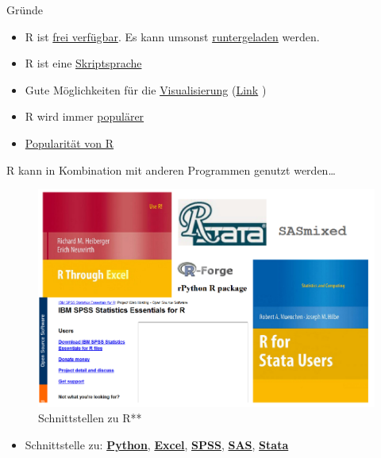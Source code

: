 \documentclass[
  ignorenonframetext,
]{beamer}
\providecommand{\tightlist}{%
  \setlength{\itemsep}{0pt}\setlength{\parskip}{0pt}}
\begin{document}
\begin{frame}{Gründe}
\protect\hypertarget{grunde}{}

\begin{itemize}
\tightlist
\item
  R ist \href{http://www.inside-r.org/why-use-r}{frei verfügbar}. Es
  kann umsonst \href{http://mirrors.softliste.de/cran/}{runtergeladen}
  werden.
\item
  R ist eine
  \href{https://de.wikipedia.org/wiki/Skriptsprache}{Skriptsprache}
\item
  Gute Möglichkeiten für die
  \href{http://research.stowers-institute.org/efg/R/}{Visualisierung}
  (\href{http://www.sr.bham.ac.uk/~ajrs/R/r-gallery.html}{Link} )
\item
  R wird immer
  \href{https://twitter.com/josiahjdavis/status/559778930476220418}{populärer}
\item
  \href{http://blog.revolutionanalytics.com/popularity/}{Popularität von
  R}
\end{itemize}

\end{frame}

\begin{frame}{R kann in Kombination mit anderen Programmen genutzt
werden\ldots{}}
\protect\hypertarget{r-kann-in-kombination-mit-anderen-programmen-genutzt-werden}{}

\begin{figure}
\centering
\includegraphics{figure/Rinterfaces.PNG}
\caption{Schnittstellen zu R**}
\end{figure}

\begin{itemize}
\tightlist
\item
  Schnittstelle zu:
  \href{https://cran.r-project.org/web/packages/reticulate/vignettes/calling_python.html}{\textbf{Python}},
  \href{https://www.springer.com/de/book/9781441900517}{\textbf{Excel}},
  \href{https://www.ibm.com/support/knowledgecenter/en/SSFUEU_7.2.0/com.ibm.swg.ba.cognos.op_capmod_ig.7.2.0.doc/t_essentials_for_r_statistics.html}{\textbf{SPSS}},
  \href{https://cran.r-project.org/web/packages/SASmixed/index.html}{\textbf{SAS}},
  \href{https://cran.r-project.org/web/packages/RStata/index.html}{\textbf{Stata}}
\end{itemize}

\end{frame}
\end{document}
